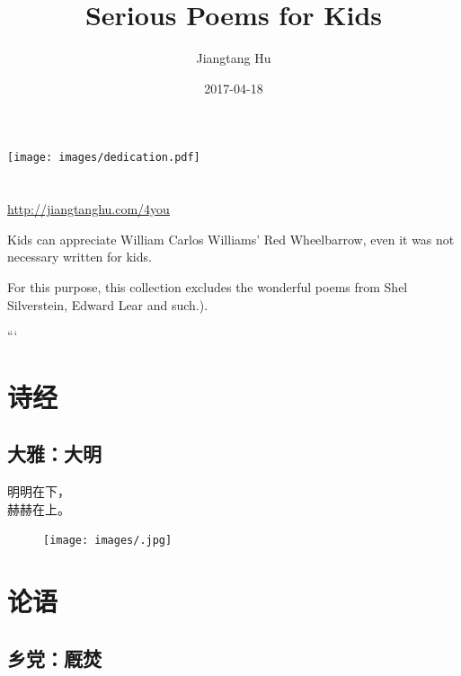 \documentclass[]{book}
\title{Serious Poems for Kids}
\author{Jiangtang Hu}
\date{2017-04-18}
\renewenvironment{quote}{\begin{VF}}{\end{VF}}
\begin{document}
\maketitle

\thispagestyle{empty}
\begin{center}
\texttt{[image: images/dedication.pdf]}
\end{center}

\setlength{\abovedisplayskip}{-5pt}
\setlength{\abovedisplayshortskip}{-5pt}

{
\setcounter{tocdepth}{2}
\tableofcontents
}
\chapter*{}\label{section}

\url{http://jiangtanghu.com/4you}

Kids can appreciate William Carlos Williams' Red Wheelbarrow, even it
was not necessary written for kids.

For this purpose, this collection excludes the wonderful poems from Shel
Silverstein, Edward Lear and such.).

```

\chapter{诗经}

\section{大雅：大明}

\begin{quote}
明明在下，\\
赫赫在上。
\end{quote}

\begin{figure}[htbp]
\centering
\texttt{[image: images/.jpg]}
\caption{}
\end{figure}

\chapter{论语}

\section{乡党：厩焚}
\end{document}
